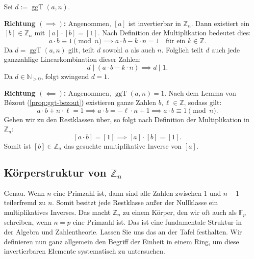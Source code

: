 \begin{math-stroke}
\begin{short-proof}
Sei $d := \operatorname{ggT}(a, n)$.

\textbf{Richtung $(\implies)$:}
Angenommen, $[a]$ ist invertierbar in $\mathbb{Z}_n$. Dann existiert ein $[b] \in \mathbb{Z}_n$ mit $[a] \cdot [b] = [1]$. Nach Definition der Multiplikation bedeutet dies:
\[
a \cdot b \equiv 1 \pmod n \implies a \cdot b - k \cdot n = 1 \quad \text{für ein } k \in \mathbb{Z}.
\]
Da $d = \operatorname{ggT}(a, n)$ gilt, teilt $d$ sowohl $a$ als auch $n$. Folglich teilt $d$ auch jede ganzzahlige Linearkombination dieser Zahlen:
\[
d \mid (a \cdot b - k \cdot n) \implies d \mid 1.
\]
Da $d \in \mathbb{N}_{>0}$, folgt zwingend $d = 1$.

\textbf{Richtung $(\impliedby)$:}
Angenommen, $\operatorname{ggT}(a, n) = 1$. Nach dem Lemma von Bézout (\cref{prop:ggt-bezout}) existieren ganze Zahlen $b, \ell \in \mathbb{Z}$, sodass gilt:
\[
a \cdot b + n \cdot \ell = 1 \implies a \cdot b = -\ell \cdot n + 1 \implies a \cdot b \equiv 1 \pmod n.
\]
Gehen wir zu den Restklassen über, so folgt nach Definition der Multiplikation in $\mathbb{Z}_n$:
\[
[a \cdot b] = [1] \implies [a] \cdot [b] = [1].
\]
Somit ist $[b] \in \mathbb{Z}_n$ das gesuchte multiplikative Inverse von $[a]$.
\end{short-proof}
\end{math-stroke}

\subsection{Körperstruktur von \texorpdfstring{$\mathbb{Z}_n$}{Zn}}

\begin{spoken-clean}[00:30:56 - 00:33:13]
Genau. Wenn $n$ eine Primzahl ist, dann sind alle Zahlen zwischen $1$ und $n-1$ teilerfremd zu $n$. Somit besitzt jede Restklasse außer der Nullklasse ein multiplikatives Inverses. Das macht $\mathbb{Z}_n$ zu einem Körper, den wir oft auch als $\mathbb{F}_p$ schreiben, wenn $n = p$ eine Primzahl ist. Das ist eine fundamentale Struktur in der Algebra und Zahlentheorie. Lassen Sie uns das an der Tafel festhalten. Wir definieren nun ganz allgemein den Begriff der Einheit in einem Ring, um diese invertierbaren Elemente systematisch zu untersuchen.
\end{spoken-clean}

